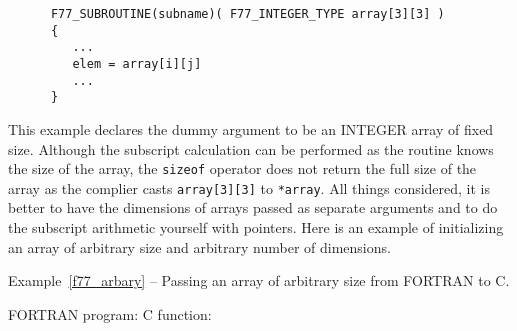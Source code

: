 \documentclass[twoside,11pt]{article}
\newcommand{\latex}[1]{#1}
\renewcommand{\_}{\texttt{\symbol{95}}}
\newcounter{examples}
\begin{document}
{\small \begin{verbatim}
      F77_SUBROUTINE(subname)( F77_INTEGER_TYPE array[3][3] )
      {
         ...
         elem = array[i][j]
         ...
      }
\end{verbatim} }

This example declares the dummy argument to be an INTEGER array of fixed size. 
Although the subscript calculation can be performed as the routine knows the
size of the array, the \texttt{sizeof} operator does not return the full size of
the array as the complier casts \texttt{array[3][3]} to \texttt{*array}. All
things considered, it is better to have the dimensions of arrays passed as
separate arguments and to do the subscript arithmetic yourself with pointers.
Here is an example of initializing an array of arbitrary size and arbitrary
number of dimensions.
\newpage
{}
\label{f77_arbary}
\begin{center}
Example\latex{~\ref{f77_arbary}}
-- Passing an array of arbitrary size from FORTRAN
to C\@.
\end{center}
\nopagebreak[4]
FORTRAN program:
\pagebreak[1]
C function:
\end{document}
